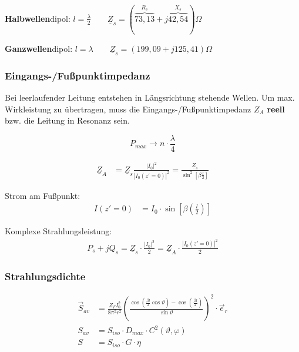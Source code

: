 \textbf{Halbwellen}dipol: $ l=\frac{\lambda}{2} \qquad
	\underline{Z}_{s}=(\overbrace{73,13}^{R_s}+j\overbrace{42,54}^{X_s})\Omega$

\textbf{Ganzwellen}dipol: $ l=\lambda \qquad \underline{Z}_{s}=(199,09+j125,41)\Omega$

\subsubsection{Eingangs-/Fußpunktimpedanz}
Bei leerlaufender Leitung entstehen in Längsrichtung stehende Wellen. Um max.
Wirkleistung zu übertragen, muss die Eingangs-/Fußpunktimpedanz $ Z_A $
\textbf{reell} bzw. die Leitung in Resonanz sein.

\begin{equation*}
	P_{max} \rightarrow n \cdot \frac{\lambda}{4}
\end{equation*}

\begin{align*}
	\underline{Z}_A & =\underline{Z}_s\frac{|I_0|^2}{|I_0(z'=0)|^2} = \frac{\underline{Z}_s}{\sin^2\left[ \beta \frac{l}{2} \right] }
\end{align*}

Strom am Fußpunkt:
\begin{align*}
	I(z'=0) & = I_0\cdot\sin\left[\beta\left(\frac{l}{2}\right)\right]
\end{align*}

Komplexe Strahlungsleistung:
\begin{align*}
	P_s +jQ_s = \underline{Z}_s\cdot \frac{|I_0|^2}{2} = \underline{Z}_A \cdot \frac{|I_0(z'=0)|^2}{2}
\end{align*}

\subsubsection{Strahlungsdichte}
\begin{align*}
	\vec{S}_{av} & = \frac{Z_FI_0^2}{8\pi^2 r^2}\left(\frac{\cos\left(\frac{\beta l }{2}\cos\vartheta\right)-\cos\left(\frac{\beta l}{2}\right)}{\sin\vartheta}\right)^2\cdot\vec{e}_r \\
	S_{av}       & = S_{iso} \cdot D_{max} \cdot C^2(\vartheta, \varphi)                                                                                                               \\
	S            & = S_{iso} \cdot G \cdot \eta
\end{align*}


